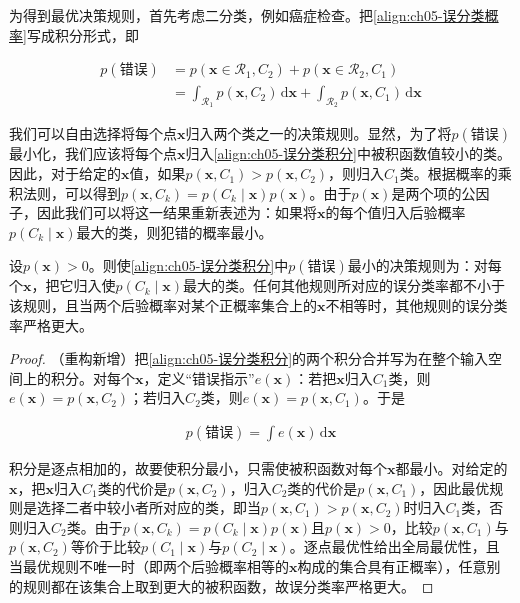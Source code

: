 \documentclass[../../main.tex]{subfiles}
\begin{document}
为得到最优决策规则，首先考虑二分类，例如癌症检查。把\eqref{align:ch05-误分类概率}写成积分形式，即

\begin{align}
  p(\text{错误})&=p(\boldsymbol{x}\in\mathcal{R}_1,C_2)+p(\boldsymbol{x}\in\mathcal{R}_2,C_1)\nonumber\\
  &=\int_{\mathcal{R}_1}p(\boldsymbol{x},C_2)\,\mathrm{d}\boldsymbol{x}+\int_{\mathcal{R}_2}p(\boldsymbol{x},C_1)\,\mathrm{d}\boldsymbol{x}
  \label{align:ch05-误分类积分}
\end{align}

我们可以自由选择将每个点$\boldsymbol{x}$归入两个类之一的决策规则。显然，为了将$p(\text{错误})$最小化，我们应该将每个点$\boldsymbol{x}$归入\eqref{align:ch05-误分类积分}中被积函数值较小的类。因此，对于给定的$\boldsymbol{x}$值，如果$p(\boldsymbol{x},C_1)>p(\boldsymbol{x},C_2)$，则归入$C_1$类。根据概率的乘积法则，可以得到$p(\boldsymbol{x},C_k)=p(C_k\mid\boldsymbol{x})p(\boldsymbol{x})$。由于$p(\boldsymbol{x})$是两个项的公因子，因此我们可以将这一结果重新表述为：如果将$\boldsymbol{x}$的每个值归入后验概率$p(C_k\mid\boldsymbol{x})$最大的类，则犯错的概率最小。

\begin{proposition}[最小误分类率规则]\label{proposition:ch05-误分类规则}
设$p(\boldsymbol{x})>0$。则使\eqref{align:ch05-误分类积分}中$p(\text{错误})$最小的决策规则为：对每个$\boldsymbol{x}$，把它归入使$p(C_k\mid\boldsymbol{x})$最大的类。任何其他规则所对应的误分类率都不小于该规则，且当两个后验概率对某个正概率集合上的$\boldsymbol{x}$不相等时，其他规则的误分类率严格更大。
\end{proposition}

\begin{proof}
（重构新增）把\eqref{align:ch05-误分类积分}的两个积分合并写为在整个输入空间上的积分。对每个$\boldsymbol{x}$，定义“错误指示”$e(\boldsymbol{x})$：若把$\boldsymbol{x}$归入$C_1$类，则$e(\boldsymbol{x})=p(\boldsymbol{x},C_2)$；若归入$C_2$类，则$e(\boldsymbol{x})=p(\boldsymbol{x},C_1)$。于是

\begin{align}
  p(\text{错误})=\int e(\boldsymbol{x})\,\mathrm{d}\boldsymbol{x}
\end{align}

积分是逐点相加的，故要使积分最小，只需使被积函数对每个$\boldsymbol{x}$都最小。对给定的$\boldsymbol{x}$，把$\boldsymbol{x}$归入$C_1$类的代价是$p(\boldsymbol{x},C_2)$，归入$C_2$类的代价是$p(\boldsymbol{x},C_1)$，因此最优规则是选择二者中较小者所对应的类，即当$p(\boldsymbol{x},C_1)>p(\boldsymbol{x},C_2)$时归入$C_1$类，否则归入$C_2$类。由于$p(\boldsymbol{x},C_k)=p(C_k\mid\boldsymbol{x})p(\boldsymbol{x})$且$p(\boldsymbol{x})>0$，比较$p(\boldsymbol{x},C_1)$与$p(\boldsymbol{x},C_2)$等价于比较$p(C_1\mid\boldsymbol{x})$与$p(C_2\mid\boldsymbol{x})$。逐点最优性给出全局最优性，且当最优规则不唯一时（即两个后验概率相等的$\boldsymbol{x}$构成的集合具有正概率），任意别的规则都在该集合上取到更大的被积函数，故误分类率严格更大。
\end{proof}
\end{document}
